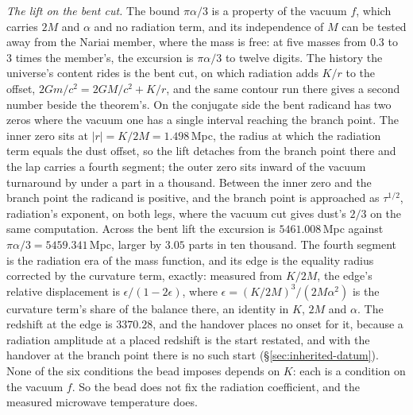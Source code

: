 \documentclass[11pt,a4paper]{article}
\theoremstyle{plain}
\theoremstyle{definition}
\theoremstyle{remark}
\begin{document}
\noindent\emph{The lift on the bent cut.} The bound $\pi\alpha/3$ is a property of the vacuum $f$, which carries $2M$ and $\alpha$ and no radiation term, and its independence of $M$ can be tested away from the Nariai member, where the mass is free: at five masses from $0.3$ to $3$ times the member's, the excursion is $\pi\alpha/3$ to twelve digits. The history the universe's content rides is the bent cut, on which radiation adds $K/r$ to the offset, $2Gm/c^2=2GM/c^2+K/r$, and the same contour run there gives a second number beside the theorem's. On the conjugate side the bent radicand has two zeros where the vacuum one has a single interval reaching the branch point. The inner zero sits at $|r|=K/2M=1.498$\,Mpc, the radius at which the radiation term equals the dust offset, so the lift detaches from the branch point there and the lap carries a fourth segment; the outer zero sits inward of the vacuum turnaround by under a part in a thousand. Between the inner zero and the branch point the radicand is positive, and the branch point is approached as $\tau^{1/2}$, radiation's exponent, on both legs, where the vacuum cut gives dust's $2/3$ on the same computation. Across the bent lift the excursion is $5461.008$\,Mpc against $\pi\alpha/3=5459.341$\,Mpc, larger by $3.05$ parts in ten thousand. The fourth segment is the radiation era of the mass function, and its edge is the equality radius corrected by the curvature term, exactly: measured from $K/2M$, the edge's relative displacement is $\epsilon/(1-2\epsilon)$, where $\epsilon=(K/2M)^{3}/(2M\alpha^{2})$ is the curvature term's share of the balance there, an identity in $K$, $2M$ and $\alpha$. The redshift at the edge is $3370.28$, and the handover places no onset for it, because a radiation amplitude at a placed redshift is the start restated, and with the handover at the branch point there is no such start (\S\ref{sec:inherited-datum}). None of the six conditions the bead imposes depends on $K$: each is a condition on the vacuum $f$. So the bead does not fix the radiation coefficient, and the measured microwave temperature does.
\end{document}
